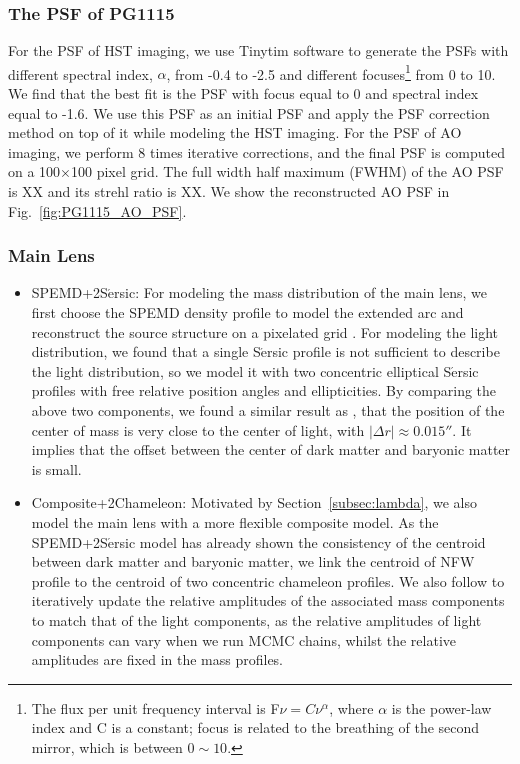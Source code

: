 \documentclass[useAMS,usenatbib]{mnras}
\newcommand{\sref}[1]{Section~\ref{#1}}
\begin{document}
\subsubsection{The PSF of PG1115}
For the PSF of HST imaging, we use {\sc Tinytim} software to generate the PSFs with different spectral index, $\alpha$, from -0.4 to -2.5 and different focuses\footnote{The flux per unit frequency interval is F$\nu=C\nu^{\alpha}$, where $\alpha$ is the power-law index and C is a constant; focus is related to the breathing of the second mirror, which is between $0\sim10$.} from 0 to 10. 
We find that the best fit is the PSF with focus equal to 0 and spectral index equal to -1.6. We use this PSF as an initial PSF and apply the PSF correction method on top of it while modeling the HST imaging.
For the PSF of AO imaging, we perform 8 times iterative corrections, and the final PSF is computed on a 100$\times$100 pixel grid. The full width half maximum (FWHM) of the AO PSF is XX and its strehl ratio is XX. We show the reconstructed AO PSF in Fig.~\ref{fig:PG1115_AO_PSF}.

\subsubsection{Main Lens}
\begin{itemize}
    \item SPEMD+2S$\acute{\text{e}}$rsic: For modeling the mass distribution of the main lens, we first choose the SPEMD density profile to model the extended arc and reconstruct the source structure on a pixelated grid \citep{SuyuEtal06}. 
    For modeling the light distribution, we found that a single S$\acute{\text{e}}$rsic profile is not sufficient to describe the light distribution, so we model it with two concentric elliptical S$\acute{\text{e}}$rsic profiles with free relative position angles and ellipticities.
    By comparing the above two components, we found a similar result as \citet{YooEtal05}, that the position of the center of mass is very close to the center of light, with $|\Delta r|\approx0.015''$. It implies that the offset between the center of dark matter and baryonic matter is small. 
    \item Composite+2Chameleon: Motivated by \sref{subsec:lambda}, we also model the main lens with a more flexible composite model. As the SPEMD+2S$\acute{\text{e}}$rsic model has already shown the consistency of the centroid between dark matter and baryonic matter, we link the centroid of NFW profile to the centroid of two concentric chameleon profiles. We also follow \citet{WongEtal17} to iteratively update the relative amplitudes of the associated mass components to match that of the light components, as the relative amplitudes of light components can vary when we run MCMC chains, whilst the relative amplitudes are fixed in the mass profiles.
\end{itemize}
\end{document}
